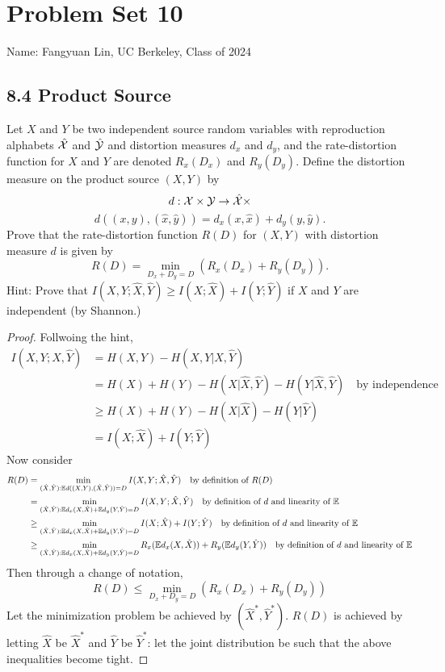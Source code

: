 \documentclass[../main.tex]{subfiles}
\begin{document}
\section*{Problem Set 10}
    Name: Fangyuan Lin, UC Berkeley, Class of 2024

\subsection*{8.4 Product Source}
Let $X$ and $Y$ be two independent source random variables with reproduction alphabets $\hat {\mathcal{X}}$ and $\hat {\mathcal{Y}}$ and distortion measures $d_x$ and $d_y$, and the rate-distortion function for $X$ and $Y$ are denoted $R_x(D_x)$ and $R_y(D_y)$. Define the distortion measure on the product source $(X,Y)$ by \[
    d:\mathcal{X}\times\mathcal{Y} \to \hat {\mathcal{X}}\times
\]
\[
 d((x,y), (\hat x,\hat y)) = d_x(x,\hat x) + d_y(y,\hat y). 
\] Prove that the rate-distortion function $R(D)$ for $(X,Y)$ with distortion measure $d$ is given by \[
R(D) = \min_{D_x+D_y=D}(R_x(D_x) + R_y(D_y)).
\]
Hint: Prove that $I(X,Y;\hat X,\hat Y)\geq I(X;\hat X) + I(Y;\hat Y)$ if $X$ and $Y$ are independent (by Shannon.)
\begin{proof}
Follwoing the hint,
    \begin{align*}
        I(X,Y; \hat X, \hat Y) &= H(X,Y)-H(X,Y|\hat X,\hat Y)\\
        &= H(X)+H(Y) - H(X|\hat X,\hat Y) - H(Y|\hat X, \hat Y) \quad \text{by independence}\\
        &\geq H(X)+H(Y)-H(X|\hat X)-H(Y|\hat Y)\\
        &= I(X;\hat X) + I(Y;\hat Y)
    \end{align*}
    Now consider \begin{align*}
        R(D) &= \min_{(\hat X,\hat Y): \mathbb{E} d((X,Y),(\hat X,\hat Y))=D}I(X,Y;\hat X,\hat Y) \quad \text{by definition of $R(D)$}\\
        &= \min_{(\hat X,\hat Y): \mathbb{E} d_x(X,\hat X) + \mathbb{E} d_y(Y,\hat Y)=D}I(X,Y;\hat X,\hat Y) \quad \text{by definition of $d$ and linearity of $\mathbb{E}$}\\
        &\geq \min_{(\hat X,\hat Y): \mathbb{E} d_x(X,\hat X) + \mathbb{E} d_y(Y,\hat Y)=D}I(X;\hat X) + I(Y;\hat Y) \quad \text{by definition of $d$ and linearity of $\mathbb{E}$}\\
        &\geq \min_{(\hat X,\hat Y): \mathbb{E} d_x(X,\hat X) + \mathbb{E} d_y(Y,\hat Y)=D}R_x(\mathbb{E} d_x(X,\hat X)) + R_y(\mathbb{E} d_y(Y,\hat Y)) \quad \text{by definition of $d$ and linearity of $\mathbb{E}$}
    \end{align*}
    Then through a change of notation, \[
    R(D)\leq \min_{D_x+D_y=D}(R_x(D_x)+R_y(D_y))
    \]
    Let the minimization problem be achieved by $(\hat X^*,\hat Y^*)$. $R(D)$ is achieved by letting $\hat X$ be $\hat X^*$ and $\hat Y$ be $\hat Y^*$: let the joint distribution be such that the above inequalities become tight.
\end{proof}
\end{document}

